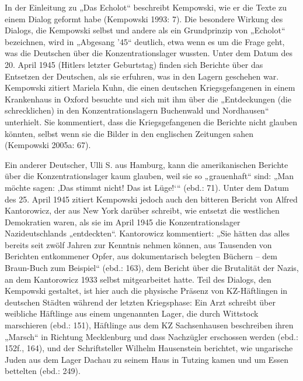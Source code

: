 \begin{multicols*}{2}
In der Einleitung zu „Das Echolot“ beschreibt Kempowski, wie er die Texte zu einem Dialog geformt habe (Kempowski 1993: 7). Die besondere Wirkung des Dialogs, die Kempowski selbst und andere als ein Grundprinzip von „Echolot“ bezeichnen, wird in „Abgesang ’45“ deutlich, etwa wenn es um die Frage geht, was die Deutschen über die Konzentrationslager wussten. Unter dem Datum des 20. April 1945 (Hitlers letzter Geburtstag) finden sich Berichte über das Entsetzen der Deutschen, als sie erfuhren, was in den Lagern geschehen war. Kempowski zitiert Mariela Kuhn, die einen deutschen Kriegsgefangenen in einem Krankenhaus in Oxford besuchte und sich mit ihm über die „Entdeckungen (die schrecklichen) in den Konzentrationslagern Buchenwald und Nordhausen“ unterhielt. Sie kommentiert, dass die Kriegsgefangenen die Berichte nicht glauben könnten, selbst wenn sie die Bilder in den englischen Zeitungen sahen (Kempowski 2005a: 67). 

Ein anderer Deutscher, Ulli S. aus Hamburg, kann die amerikanischen Berichte über die Konzentrationslager kaum glauben, weil sie so „grauenhaft“ sind: „Man möchte sagen: ‚Das stimmt nicht! Das ist Lüge!‘“ (ebd.: 71). Unter dem Datum des 25. April 1945 zitiert Kempowski jedoch auch den bitteren Bericht von Alfred Kantorowicz, der aus New York darüber schreibt, wie entsetzt die westlichen Demokratien waren, als sie im April 1945 die Konzentrationslager Nazideutschlands „entdeckten“. Kantorowicz kommentiert: „Sie hätten das alles bereits seit zwölf Jahren zur Kenntnis nehmen können, aus Tausenden von Berichten entkommener Opfer, aus dokumentarisch belegten Büchern – dem Braun-Buch zum Beispiel“ (ebd.: 163), dem Bericht über die Brutalität der Nazis, an dem Kantorowicz 1933 selbst mitgearbeitet hatte. Teil des Dialogs, den Kempowski gestaltet, ist hier auch die physische Präsenz von KZ-Häftlingen in deutschen Städten während der letzten Kriegsphase: Ein Arzt schreibt über weibliche Häftlinge aus einem ungenannten Lager, die durch Wittstock marschieren (ebd.: 151), Häftlinge aus dem KZ Sachsenhausen beschreiben ihren „Marsch“ in Richtung Mecklenburg und dass Nachzügler erschossen werden (ebd.: 152f., 164), und der Schriftsteller Wilhelm Hausenstein berichtet, wie ungarische Juden aus dem Lager Dachau zu seinem Haus in Tutzing kamen und um Essen bettelten (ebd.: 249).


\end{multicols*}
